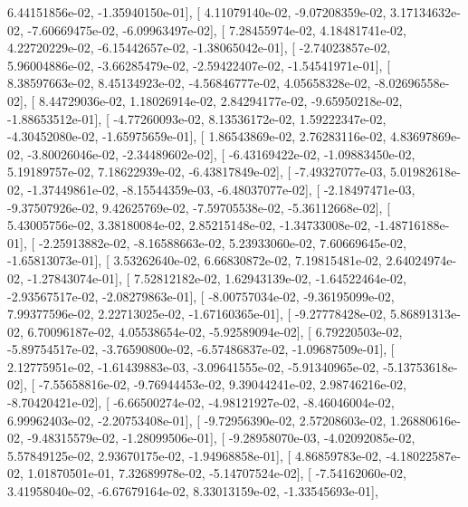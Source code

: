 \documentclass{article}
\begin{document}
          6.44151856e-02,  -1.35940150e-01],
       [  4.11079140e-02,  -9.07208359e-02,   3.17134632e-02,
         -7.60669475e-02,  -6.09963497e-02],
       [  7.28455974e-02,   4.18481741e-02,   4.22720229e-02,
         -6.15442657e-02,  -1.38065042e-01],
       [ -2.74023857e-02,   5.96004886e-02,  -3.66285479e-02,
         -2.59422407e-02,  -1.54541971e-01],
       [  8.38597663e-02,   8.45134923e-02,  -4.56846777e-02,
          4.05658328e-02,  -8.02696558e-02],
       [  8.44729036e-02,   1.18026914e-02,   2.84294177e-02,
         -9.65950218e-02,  -1.88653512e-01],
       [ -4.77260093e-02,   8.13536172e-02,   1.59222347e-02,
         -4.30452080e-02,  -1.65975659e-01],
       [  1.86543869e-02,   2.76283116e-02,   4.83697869e-02,
         -3.80026046e-02,  -2.34489602e-02],
       [ -6.43169422e-02,  -1.09883450e-02,   5.19189757e-02,
          7.18622939e-02,  -6.43817849e-02],
       [ -7.49327077e-03,   5.01982618e-02,  -1.37449861e-02,
         -8.15544359e-03,  -6.48037077e-02],
       [ -2.18497471e-03,  -9.37507926e-02,   9.42625769e-02,
         -7.59705538e-02,  -5.36112668e-02],
       [  5.43005756e-02,   3.38180084e-02,   2.85215148e-02,
         -1.34733008e-02,  -1.48716188e-01],
       [ -2.25913882e-02,  -8.16588663e-02,   5.23933060e-02,
          7.60669645e-02,  -1.65813073e-01],
       [  3.53262640e-02,   6.66830872e-02,   7.19815481e-02,
          2.64024974e-02,  -1.27843074e-01],
       [  7.52812182e-02,   1.62943139e-02,  -1.64522464e-02,
         -2.93567517e-02,  -2.08279863e-01],
       [ -8.00757034e-02,  -9.36195099e-02,   7.99377596e-02,
          2.22713025e-02,  -1.67160365e-01],
       [ -9.27778428e-02,   5.86891313e-02,   6.70096187e-02,
          4.05538654e-02,  -5.92589094e-02],
       [  6.79220503e-02,  -5.89754517e-02,  -3.76590800e-02,
         -6.57486837e-02,  -1.09687509e-01],
       [  2.12775951e-02,  -1.61439883e-03,  -3.09641555e-02,
         -5.91340965e-02,  -5.13753618e-02],
       [ -7.55658816e-02,  -9.76944453e-02,   9.39044241e-02,
          2.98746216e-02,  -8.70420421e-02],
       [ -6.66500274e-02,  -4.98121927e-02,  -8.46046004e-02,
          6.99962403e-02,  -2.20753408e-01],
       [ -9.72956390e-02,   2.57208603e-02,   1.26880616e-02,
         -9.48315579e-02,  -1.28099506e-01],
       [ -9.28958070e-03,  -4.02092085e-02,   5.57849125e-02,
          2.93670175e-02,  -1.94968858e-01],
       [  4.86859783e-02,  -4.18022587e-02,   1.01870501e-01,
          7.32689978e-02,  -5.14707524e-02],
       [ -7.54162060e-02,   3.41958040e-02,  -6.67679164e-02,
          8.33013159e-02,  -1.33545693e-01],
\end{document}

